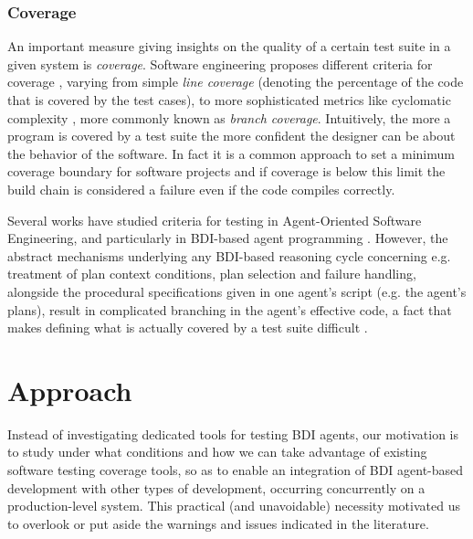 \subsubsection{Coverage}
An important measure giving insights on the quality of a certain test suite in a given system is \textit{coverage}. Software engineering proposes different criteria for coverage \cite{ArtOfTesting}, varying from simple \textit{line coverage} (denoting the percentage of the code that is covered by the test cases), to more sophisticated metrics like cyclomatic complexity \cite{McCabe}, more commonly known as \textit{branch coverage}. Intuitively, the more a program is covered by a test suite the more confident the designer can be about the behavior of the software. In fact it is a common approach to set a minimum coverage boundary for software projects and if coverage is below this limit the build chain is considered a failure even if the code compiles correctly.

Several works have studied criteria for testing in Agent-Oriented Software Engineering, and particularly in BDI-based agent programming \cite{Padgham2013}. However, the abstract mechanisms underlying any BDI-based reasoning cycle concerning e.g. treatment of plan context conditions, plan selection and failure handling, alongside the procedural specifications given in one agent's script (e.g. the agent's plans), result in complicated branching in the agent's effective code, a fact that makes defining what is actually covered by a test suite difficult \cite{Winikoff2015,Winikoff2017}.%


\section{Approach}
\label{sec:approach}
Instead of investigating dedicated tools for testing BDI agents, our motivation is to study under what conditions and how we can take advantage of existing software testing coverage tools, so as to enable an integration of BDI agent-based development with other types of development, occurring concurrently on a production-level system.
This practical (and unavoidable) necessity motivated us to overlook or put aside the warnings and issues indicated in the literature. 

